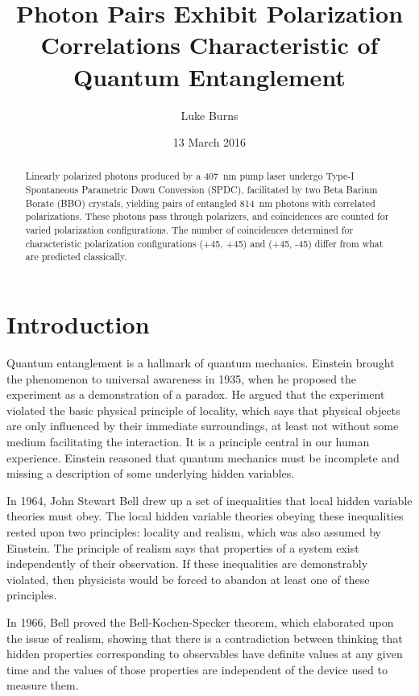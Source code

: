 \documentclass{article}
\title{Photon Pairs Exhibit Polarization Correlations Characteristic of Quantum Entanglement}
\author{Luke Burns}
\date{13 March 2016}
\begin{document}
\maketitle

\begin{abstract}
  Linearly polarized photons produced by a 407~nm pump laser undergo Type-I Spontaneous Parametric Down Conversion (SPDC), facilitated by two Beta Barium Borate (BBO) crystals, yielding pairs of entangled 814~nm photons with correlated polarizations. These photons pass through polarizers, and coincidences are counted for varied polarization configurations. The number of coincidences determined for characteristic polarization configurations (+45, +45) and (+45, -45) differ from what are predicted classically.
\end{abstract}

\section{Introduction}

Quantum entanglement is a hallmark of quantum mechanics. Einstein brought the phenomenon to universal awareness in 1935, when he proposed the experiment as a demonstration of a paradox.\cite{einstein} He argued that the experiment violated the basic physical principle of locality, which says that physical objects are only influenced by their immediate surroundings, at least not without some medium facilitating the interaction. It is a principle central in our human experience. Einstein reasoned that quantum mechanics must be incomplete and missing a description of some underlying hidden variables.

In 1964, John Stewart Bell drew up a set of inequalities that local hidden variable theories must obey. The local hidden variable theories obeying these inequalities rested upon two principles: locality and realism, which was also assumed by Einstein. The principle of realism says that properties of a system exist independently of their observation. If these inequalities are demonstrably violated, then physicists would be forced to abandon at least one of these principles.\cite{bell}

In 1966, Bell proved the Bell-Kochen-Specker theorem, which elaborated upon the issue of realism, showing that there is a contradiction between thinking that hidden properties corresponding to observables have definite values at any given time and the values of those properties are independent of the device used to measure them.\cite{bell2}
\end{document}
